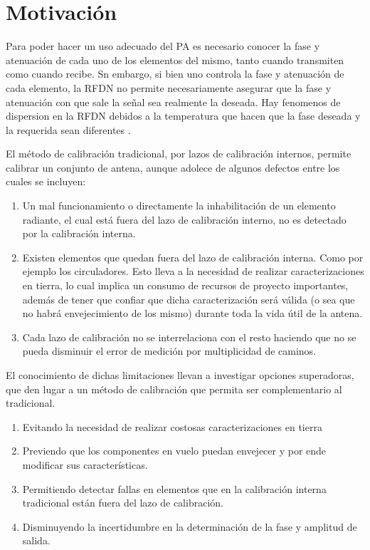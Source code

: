\section{Motivación} \label{sc:motivation}

Para poder hacer un uso adecuado del PA es necesario conocer la fase y atenuación de cada uno de los elementos del mismo, tanto
cuando transmiten como cuando recibe. Sn embargo, si bien uno controla la fase y atenuación de cada elemento, la RFDN no permite
necesariamente asegurar que la fase y atenuación con que sale la señal sea realmente la deseada. Hay fenomenos de dispersion en
la RFDN debidos a la temperatura que hacen que la fase deseada y la requerida sean diferentes \cite{Keizer2011}.

El método de calibración tradicional, por lazos de calibración internos, permite calibrar un conjunto de antena, aunque
adolece de algunos defectos entre los cuales se incluyen:

\begin{enumerate}
    \item Un mal funcionamiento o directamente la inhabilitación de un elemento radiante, el cual está fuera del lazo de
		calibración interno, no es detectado por la calibración interna.
    \item Existen elementos que quedan fuera del lazo de calibración interna. Como por ejemplo los circuladores. Esto lleva a
		la necesidad de realizar caracterizaciones en tierra, lo cual implica un consumo de recursos de proyecto importantes,
		además de tener que confiar que dicha caracterización será válida (o sea que no habrá envejecimiento de los mismo)
		durante toda la vida útil de la antena.
    \item Cada lazo de calibración no se interrelaciona con el resto haciendo que no se pueda disminuir el error de medición por
		multiplicidad de caminos.
\end{enumerate}

El conocimiento de dichas limitaciones llevan a investigar opciones superadoras, que den lugar a un método de calibración que 
permita ser complementario al tradicional. 
\begin{enumerate}
	\item Evitando la necesidad de realizar costosas caracterizaciones en tierra
	\item Previendo que los componentes en vuelo puedan envejecer y por ende modificar sus características.
	\item Permitiendo detectar fallas en elementos que en la calibración interna tradicional están fuera del lazo de calibración.
	\item Disminuyendo la incertidumbre en la determinación de la fase y amplitud de salida.
\end{enumerate}

